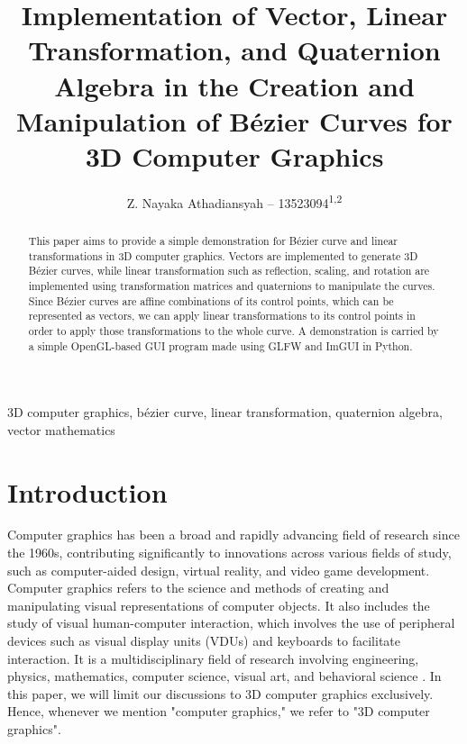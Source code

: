 \documentclass[conference]{IEEEtran}
\begin{document}
\title{Implementation of Vector, Linear Transformation, and Quaternion Algebra in the Creation and Manipulation of Bézier Curves for 3D Computer Graphics}

\author{{Z. Nayaka Athadiansyah -- 13523094\textsuperscript{1,2}} \\
}

\maketitle

\begin{abstract}
    This paper aims to provide a simple demonstration for Bézier curve and linear transformations in 3D computer graphics. Vectors are implemented to generate 3D Bézier curves, while linear transformation such as reflection, scaling, and rotation are implemented using transformation matrices and quaternions to manipulate the curves. Since Bézier curves are affine combinations of its control points, which can be represented as vectors, we can apply linear transformations to its control points in order to apply those transformations to the whole curve. A demonstration is carried by a simple OpenGL-based GUI program made using GLFW and ImGUI in Python.
\end{abstract}

\begin{IEEEkeywords}
3D computer graphics, bézier curve, linear transformation, quaternion algebra, vector mathematics
\end{IEEEkeywords}

\section{Introduction}Computer graphics has been a broad and rapidly advancing field of research since the 1960s, contributing significantly to innovations across various fields of study\cite{hughes}, such as computer-aided design, virtual reality, and video game development. Computer graphics refers to the science and methods of creating and manipulating visual representations of computer objects\cite{eck}. It also includes the study of visual human-computer interaction, which involves the use of peripheral devices such as visual display units (VDUs) and keyboards to facilitate interaction. It is a multidisciplinary field of research involving engineering, physics, mathematics, computer science, visual art, and behavioral science \cite{hughes}. In this paper, we will limit our discussions to 3D computer graphics exclusively. Hence, whenever we mention "computer graphics," we refer to "3D computer graphics".
\end{document}
